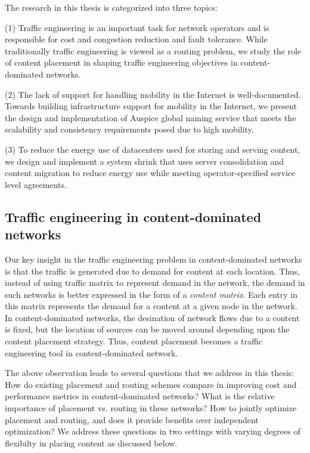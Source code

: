 The research in this thesis is categorized into three topics: 

(1) Traffic engineering is an important task for network operators and is responsible for cost and congestion reduction and fault tolerance. While traditionally traffic engineering is viewed as a routing problem, we study the role of content placement in shaping traffic engineering objectives in content-dominated networks.

(2) The lack of support for handling mobility in the Internet is well-documented. Towards building infrastructure support for mobility in the Internet, we present the design and implementation of Auspice global naming service that meets the scalability and consistency requirements posed due to high mobility.

(3) To reduce the energy use of datacenters used for storing and serving content, we design and implement a system shrink that uses server consolidation and content migration to reduce energy use while meeting operator-specified service level agreements.


\subsection{Traffic engineering in content-dominated networks}
Our key insight in the traffic engineering problem in content-dominated networks is that the traffic is generated due to demand for content at each location. Thus, instead of using traffic matrix to represent demand in the network, the demand in such networks is better expressed in the form of a \emph{content matrix}. Each entry in this matrix represents the demand for a content at a given node in the network. In content-dominated networks, the desination of network flows due to a content is fixed, but the location of sources can be moved around depending upon the content placement strategy. Thus, content placement becomes a traffic engineering tool in content-dominated network.

The above observation leads to several questions that we address in this thesis: How do existing placement and routing schemes compare in improving cost and performance metrics in content-dominated networks? What is the relative importance of placement vs. routing in these networks? How to jointly optimize placement and routing, and does it provide benefits over independent optimization?  We address these questions in two settings with varying degrees of flexibilty in placing content as discussed below. 


